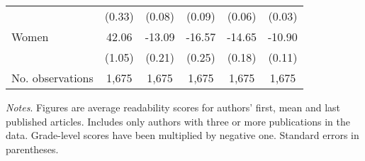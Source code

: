 \begin{table}[H]
\begin{threeparttable}
\begin{tabular}{p{3cm}S@{}S@{}S@{}S@{}S@{}}
                                          &      (0.33)&      (0.08)&      (0.09)&      (0.06)&      (0.03)\\
            \quad Women                   &       42.06&      -13.09&      -16.57&      -14.65&      -10.90\\
                                          &      (1.05)&      (0.21)&      (0.25)&      (0.18)&      (0.11)\\
            \midrule
            No. observations              &       1,675&       1,675&       1,675&       1,675&       1,675\\
            \bottomrule
        \end{tabular}
        \begin{tablenotes}
            \tiny
            \item \textit{Notes}. Figures are average readability scores for authors' first, mean and last published articles. Includes only authors with three or more publications in the data. Grade-level scores have been multiplied by negative one. Standard errors in parentheses.
        \end{tablenotes}
    \end{threeparttable}
\end{table}